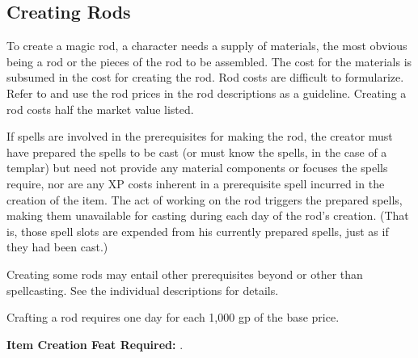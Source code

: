 \subsection{Creating Rods}
To create a magic rod, a character needs a supply of materials, the most obvious being a rod or the pieces of the rod to be assembled. The cost for the materials is subsumed in the cost for creating the rod. Rod costs are difficult to formularize. Refer to  and use the rod prices in the rod descriptions as a guideline. Creating a rod costs half the market value listed.

If spells are involved in the prerequisites for making the rod, the creator must have prepared the spells to be cast (or must know the spells, in the case of a templar) but need not provide any material components or focuses the spells require, nor are any XP costs inherent in a prerequisite spell incurred in the creation of the item. The act of working on the rod triggers the prepared spells, making them unavailable for casting during each day of the rod's creation. (That is, those spell slots are expended from his currently prepared spells, just as if they had been cast.)

Creating some rods may entail other prerequisites beyond or other than spellcasting. See the individual descriptions for details.

Crafting a rod requires one day for each 1,000 gp of the base price.

\textbf{Item Creation Feat Required:} .
